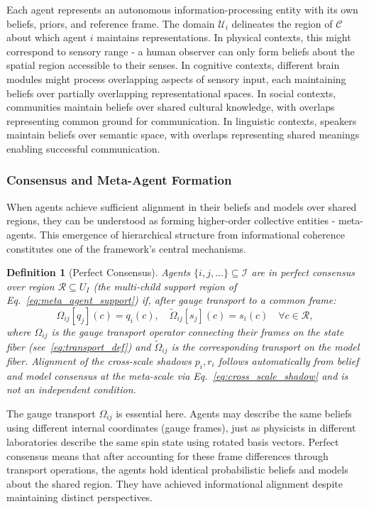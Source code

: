\documentclass[11pt]{article}
\newtheorem{definition}{Definition}
\begin{document}
Each agent represents an autonomous information-processing entity with its own beliefs, priors, and reference frame. The domain $\mathcal{U}_i$ delineates the region of $\mathcal{C}$ about which agent $i$ maintains representations. In physical contexts, this might correspond to sensory range - a human observer can only form beliefs about the spatial region accessible to their senses. In cognitive contexts, different brain modules might process overlapping aspects of sensory input, each maintaining beliefs over partially overlapping representational spaces. In social contexts, communities maintain beliefs over shared cultural knowledge, with overlaps representing common ground for communication. In linguistic contexts, speakers maintain beliefs over semantic space, with overlaps representing shared meanings enabling successful communication.

\subsubsection{Consensus and Meta-Agent Formation}

When agents achieve sufficient alignment in their beliefs and models over shared regions, they can be understood as forming higher-order collective entities - meta-agents. This emergence of hierarchical structure from informational coherence constitutes one of the framework's central mechanisms.

\begin{definition}[Perfect Consensus]
Agents $\{i, j, \ldots\} \subseteq \mathcal{I}$ are in perfect consensus over region $\mathcal{R} \subseteq U_I$ (the multi-child support region of Eq.~\eqref{eq:meta_agent_support}) if, after gauge transport to a common frame:
\begin{equation}
\Omega_{ij}[q_j](c) = q_i(c), \quad \tilde{\Omega}_{ij}[s_j](c) = s_i(c) \quad \forall c \in \mathcal{R},
\end{equation}
where $\Omega_{ij}$ is the gauge transport operator connecting their frames on the state fiber (see~\eqref{eq:transport_def}) and $\tilde{\Omega}_{ij}$ is the corresponding transport on the model fiber. Alignment of the cross-scale shadows $p_i, r_i$ follows automatically from belief and model consensus at the meta-scale via Eq.~\eqref{eq:cross_scale_shadow} and is not an independent condition.
\end{definition}

The gauge transport $\Omega_{ij}$ is essential here. Agents may describe the same beliefs using different internal coordinates (gauge frames), just as physicists in different laboratories describe the same spin state using rotated basis vectors. Perfect consensus means that after accounting for these frame differences through transport operations, the agents hold identical probabilistic beliefs and models about the shared region. They have achieved informational alignment despite maintaining distinct perspectives.
\end{document}
